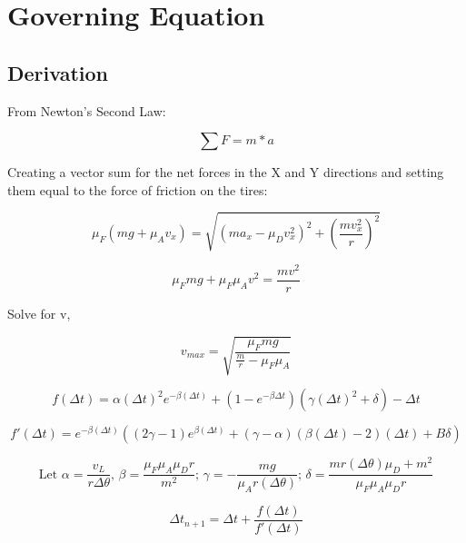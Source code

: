 \documentclass{article}
\begin{document}
\section{Governing Equation}
\subsection{Derivation}

\centering From Newton's Second Law:

\begin{equation}
    \sum F=m*a
\end{equation}

\centering Creating a vector sum for the net forces in the X and Y directions and setting them equal to the force of friction on the tires:

\begin{equation}
    \mu_F(mg+\mu_Av_x) = \sqrt{(ma_x - \mu_Dv_x^2)^2 + (\frac{mv_x^2}{r})^2}
\end{equation}

\begin{equation}
    \mu_Fmg+\mu_F\mu_Av^2 = \frac{mv^2}{r}
\end{equation}

Solve for v,

\begin{equation}
    v_{max}=\sqrt{\frac{\mu_Fmg}{\frac{m}{r}-\mu_F\mu_A}}
\end{equation}

\begin{equation}
    f(\Delta t) = \alpha (\Delta t)^2 e^{-\beta(\Delta t)} + (1-e^{-\beta\Delta t})(\gamma (\Delta t)^2 + \delta)-\Delta t
\end{equation}

\begin{equation}
    f'(\Delta t) = e^{-\beta(\Delta t)}((2\gamma - 1)e^{\beta (\Delta t)} + (\gamma - \alpha)(\beta (\Delta t) -2)(\Delta t) + B\delta)
\end{equation}

\begin{equation}
    \text{Let } \alpha = \frac{v_L}{r\Delta \theta} \text{, } \beta = \frac{\mu_F\mu_A\mu_Dr}{m^2} \text{; } \gamma = -\frac{mg}{\mu_Ar(\Delta \theta)} \text{; } \delta = \frac{mr(\Delta\theta)\mu_D + m^2}{\mu_F\mu_A\mu_Dr}
\end{equation}

\begin{equation}
    \Delta t_{n+1} = \Delta t + \frac{f(\Delta t)}{f'(\Delta t)}
\end{equation}
\end{document}
